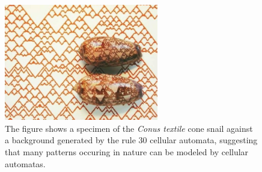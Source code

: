 \begin{figure}[h!]
  \centering
  \includegraphics[width=0.6\textwidth]{fig/CApattern.png}
  \caption{
    The figure shows a specimen of the \emph{Conus textile} cone snail
    against a background generated by the rule 30 cellular automata, suggesting
    that many patterns occuring in nature can be modeled by cellular automatas.
    }
  \label{figCX}
\end{figure}
